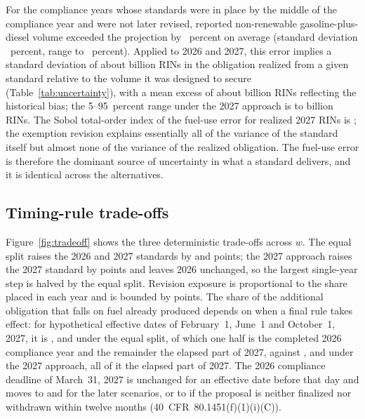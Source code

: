 \documentclass[preprint,12pt,authoryear]{elsarticle}
\begin{document}
For the \valnFuelErrorsProspective{} compliance years whose standards were in place by the middle of the compliance year and were not later revised, reported non-renewable gasoline-plus-diesel volume exceeded the projection by \valfuelErrorMeanPct{}~percent on average (standard deviation \valfuelErrorSdPct{}~percent, range \valfuelErrorMinPct{} to \valfuelErrorMaxPct{}~percent). Applied to 2026 and 2027, this error implies a standard deviation of about \valrealizedMinusIntendedSdSecondEqual{} billion RINs in the obligation realized from a given standard relative to the volume it was designed to secure (Table~\ref{tab:uncertainty}), with a mean excess of about \valrealizedMinusIntendedMeanSecondAllSecond{} billion RINs reflecting the historical bias; the 5--95~percent range under the 2027 approach is \valrealizedMinusIntendedQZeroFiveSecondAllSecond{} to \valrealizedMinusIntendedQNineFiveSecondAllSecond{} billion RINs. The Sobol total-order index of the fuel-use error for realized 2027 RINs is \valsobolFuelRealizedSecondEqual{}; the exemption revision explains essentially all of the variance of the standard itself but almost none of the variance of the realized obligation. The fuel-use error is therefore the dominant source of uncertainty in what a standard delivers, and it is identical across the alternatives.



\subsection{Timing-rule trade-offs}

Figure~\ref{fig:tradeoff} shows the three deterministic trade-offs across $w$. The equal split raises the 2026 and 2027 standards by \valstepFirstEqual{} and \valstepSecondEqual{} points; the 2027 approach raises the 2027 standard by \valstepSecondAllSecond{} points and leaves 2026 unchanged, so the largest single-year step is halved by the equal split. Revision exposure is proportional to the share placed in each year and is bounded by \valrevisionMeanAbsSecondAllSecond{} points. The share of the additional obligation that falls on fuel already produced depends on when a final rule takes effect: for hypothetical effective dates of February~1, June~1 and October~1, 2027, it is \valretroEqualScenarioHypotheticalEarlyTwoZeroTwoSeven{}, \valretroEqualScenarioHypotheticalMidTwoZeroTwoSeven{} and \valretroEqualScenarioHypotheticalLateTwoZeroTwoSeven{} under the equal split, of which one half is the completed 2026 compliance year and the remainder the elapsed part of 2027, against \valretroAllSecondScenarioHypotheticalEarlyTwoZeroTwoSeven{}, \valretroAllSecondScenarioHypotheticalMidTwoZeroTwoSeven{} and \valretroAllSecondScenarioHypotheticalLateTwoZeroTwoSeven{} under the 2027 approach, all of it the elapsed part of 2027. The 2026 compliance deadline of March~31, 2027 is unchanged for an effective date before that day and moves to \valdeadlineScenarioHypotheticalMidTwoZeroTwoSeven{} and \valdeadlineScenarioHypotheticalLateTwoZeroTwoSeven{} for the later scenarios, or to \valdeadlineNotFinalized{} if the proposal is neither finalized nor withdrawn within twelve months (40~CFR~80.1451(f)(1)(i)(C)).
\end{document}

